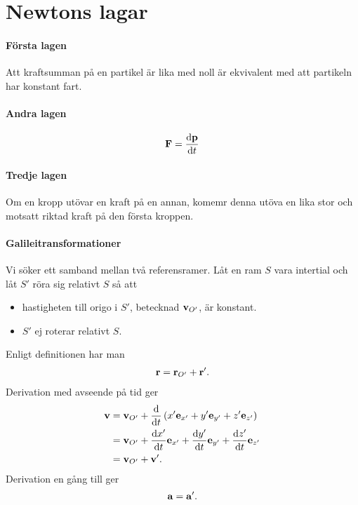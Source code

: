 \section{Newtons lagar}

\paragraph{Första lagen}
Att kraftsumman på en partikel är lika med noll är ekvivalent med att partikeln har konstant fart.

\paragraph{Andra lagen}
\begin{align*}
	\vect{F} = \dv{\vect{p}}{t}
\end{align*}

\paragraph{Tredje lagen}
Om en kropp utövar en kraft på en annan, komemr denna utöva en lika stor och motsatt riktad kraft på den första kroppen.

\paragraph{Galileitransformationer}
Vi söker ett samband mellan två referensramer. Låt en ram $S$ vara intertial och låt $S'$ röra sig relativt $S$ så att
\begin{itemize}
	\item hastigheten till origo i $S'$, betecknad $\vb{v}_{O'}$, är konstant.
	\item $S'$ ej roterar relativt $S$.
\end{itemize}

Enligt definitionen har man
\begin{align*}
	\vb{r} = \vb{r}_{O'} + \vb{r}'.
\end{align*}
Derivation med avseende på tid ger
\begin{align*}
	\vb{v} &= \vb{v}_{O'} + \dv{t}\left(x'\vb{e}_{x'} + y'\vb{e}_{y'} + z'\vb{e}_{z'}\right) \\
	       &= \vb{v}_{O'} + \dv{x'}{t}\vb{e}_{x'} + \dv{y'}{t}\vb{e}_{y'} + \dv{z'}{t}\vb{e}_{z'} \\
	       &= \vb{v}_{O'} + \vb{v}'.
\end{align*}
Derivation en gång till ger
\begin{align*}
	\vb{a} = \vb{a}'.
\end{align*}

